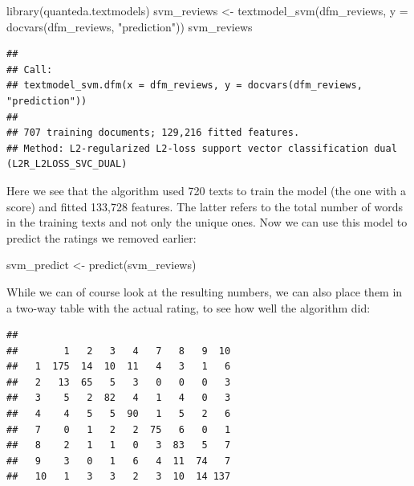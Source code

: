 \documentclass[
]{book}
\newenvironment{Shaded}{\begin{snugshade}}{\end{snugshade}}
\newcommand{\AttributeTok}[1]{\textcolor[rgb]{0.77,0.63,0.00}{#1}}
\newcommand{\FunctionTok}[1]{\textcolor[rgb]{0.00,0.00,0.00}{#1}}
\newcommand{\NormalTok}[1]{#1}
\newcommand{\OtherTok}[1]{\textcolor[rgb]{0.56,0.35,0.01}{#1}}
\newcommand{\SpecialCharTok}[1]{\textcolor[rgb]{0.00,0.00,0.00}{#1}}
\newcommand{\StringTok}[1]{\textcolor[rgb]{0.31,0.60,0.02}{#1}}
\begin{document}
\begin{Shaded}
\begin{Highlighting}[]
\FunctionTok{library}\NormalTok{(quanteda.textmodels)}
\NormalTok{svm\_reviews }\OtherTok{\textless{}{-}} \FunctionTok{textmodel\_svm}\NormalTok{(dfm\_reviews, }\AttributeTok{y =} \FunctionTok{docvars}\NormalTok{(dfm\_reviews, }\StringTok{"prediction"}\NormalTok{))}
\NormalTok{svm\_reviews}
\end{Highlighting}
\end{Shaded}

\begin{verbatim}
## 
## Call:
## textmodel_svm.dfm(x = dfm_reviews, y = docvars(dfm_reviews, "prediction"))
## 
## 707 training documents; 129,216 fitted features.
## Method: L2-regularized L2-loss support vector classification dual (L2R_L2LOSS_SVC_DUAL)
\end{verbatim}

Here we see that the algorithm used 720 texts to train the model (the one with a score) and fitted 133,728 features. The latter refers to the total number of words in the training texts and not only the unique ones. Now we can use this model to predict the ratings we removed earlier:

\begin{Shaded}
\begin{Highlighting}[]
\NormalTok{svm\_predict }\OtherTok{\textless{}{-}} \FunctionTok{predict}\NormalTok{(svm\_reviews)}
\end{Highlighting}
\end{Shaded}

While we can of course look at the resulting numbers, we can also place them in a two-way table with the actual rating, to see how well the algorithm did:

\begin{Shaded}
\end{Shaded}

\begin{verbatim}
##     
##        1   2   3   4   7   8   9  10
##   1  175  14  10  11   4   3   1   6
##   2   13  65   5   3   0   0   0   3
##   3    5   2  82   4   1   4   0   3
##   4    4   5   5  90   1   5   2   6
##   7    0   1   2   2  75   6   0   1
##   8    2   1   1   0   3  83   5   7
##   9    3   0   1   6   4  11  74   7
##   10   1   3   3   2   3  10  14 137
\end{verbatim}
\end{document}
